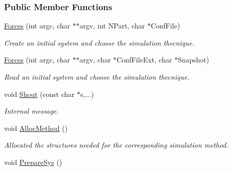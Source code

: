 \subsubsection*{\-Public \-Member \-Functions}
\begin{DoxyCompactItemize}
\item 
\hypertarget{classForces_a0b40ef47e7e825a72223abc459561c10}{\hyperlink{classForces_a0b40ef47e7e825a72223abc459561c10}{\-Forces} (int argc, char $\ast$$\ast$argv, int \-N\-Part, char $\ast$\-Conf\-File)}\label{classForces_a0b40ef47e7e825a72223abc459561c10}

\begin{DoxyCompactList}\small\item\em \-Create an initial system and choose the simulation thecnique. \end{DoxyCompactList}\item 
\hypertarget{classForces_abbcd2fc791d4ded94db5172ef1000e42}{\hyperlink{classForces_abbcd2fc791d4ded94db5172ef1000e42}{\-Forces} (int argc, char $\ast$$\ast$argv, char $\ast$\-Conf\-File\-Ext, char $\ast$\-Snapshot)}\label{classForces_abbcd2fc791d4ded94db5172ef1000e42}

\begin{DoxyCompactList}\small\item\em \-Read an initial system and choose the simulation thecnique. \end{DoxyCompactList}\item 
\hypertarget{classForces_ac11429f7ec42e6eb4806e77f8aa24e7f}{void \hyperlink{classForces_ac11429f7ec42e6eb4806e77f8aa24e7f}{\-Shout} (const char $\ast$s,...)}\label{classForces_ac11429f7ec42e6eb4806e77f8aa24e7f}

\begin{DoxyCompactList}\small\item\em \-Internal message. \end{DoxyCompactList}\item 
\hypertarget{classForces_aa7040ce5b212b067b9edc0e48966f593}{void \hyperlink{classForces_aa7040ce5b212b067b9edc0e48966f593}{\-Alloc\-Method} ()}\label{classForces_aa7040ce5b212b067b9edc0e48966f593}

\begin{DoxyCompactList}\small\item\em \-Allocated the structures needed for the corresponding simulation method. \end{DoxyCompactList}\item 
\hypertarget{classForces_a053a9be7328b6a532baf8774f8479188}{void \hyperlink{classForces_a053a9be7328b6a532baf8774f8479188}{\-Prepare\-Sys} ()}\label{classForces_a053a9be7328b6a532baf8774f8479188}


\end{DoxyCompactItemize}
